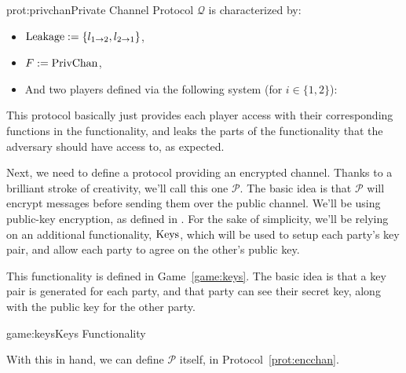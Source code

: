 \begin{protocol}{prot:privchan}{Private Channel Protocol}
    $\mathcal{Q}$ is characterized by:
    \begin{itemize}
        \item $\text{Leakage} := \{l_{1\to 2}, l_{2\to1}\}$,
        \item $F := \text{PrivChan}$,
        \item And two players defined via the following system (for $i \in \{1, 2\}$):
    \end{itemize}

\end{protocol}

This protocol basically just provides each player access with their corresponding
functions in the functionality, and leaks the parts of the functionality
that the adversary should have access to, as expected.

Next, we need to define a protocol providing an encrypted channel.
Thanks to a brilliant stroke of creativity, we'll call this one $\mathcal{P}$.
The basic idea is that $\mathcal{P}$ will encrypt messages before sending
them over the public channel.
We'll be using public-key encryption, as defined in .
For the sake of simplicity, we'll be relying on an additional functionality,
$\text{Keys}$, which will be used to setup each party's key pair, and allow
each party to agree on the other's public key.

This functionality is defined in Game~\ref{game:keys}.
The basic idea is that a key pair is generated for each party,
and that party can see their secret key, along with the public key for the other party.

\begin{game}{game:keys}{Keys Functionality}
\end{game}

With this in hand, we can define $\mathcal{P}$ itself, in Protocol~\ref{prot:encchan}.

